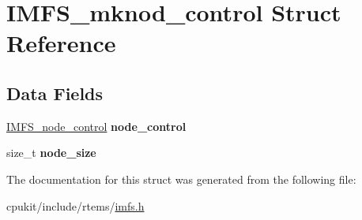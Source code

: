 \hypertarget{structIMFS__mknod__control}{}\section{I\+M\+F\+S\+\_\+mknod\+\_\+control Struct Reference}
\label{structIMFS__mknod__control}
\subsection*{Data Fields}
\begin{DoxyCompactItemize}
\item 
\mbox{\label{structIMFS__mknod__control_a197b3319b31b52e70f00531f4d3fc9cc}} 
\mbox{\hyperlink{structIMFS__node__control}{I\+M\+F\+S\+\_\+node\+\_\+control}} {\bfseries node\+\_\+control}
\item 
\mbox{\label{structIMFS__mknod__control_af8040d431a59fabcd23ec6d1d10a0b89}} 
size\+\_\+t {\bfseries node\+\_\+size}
\end{DoxyCompactItemize}


The documentation for this struct was generated from the following file\+:\begin{DoxyCompactItemize}
\item 
cpukit/include/rtems/\mbox{\hyperlink{imfs_8h}{imfs.\+h}}\end{DoxyCompactItemize}
